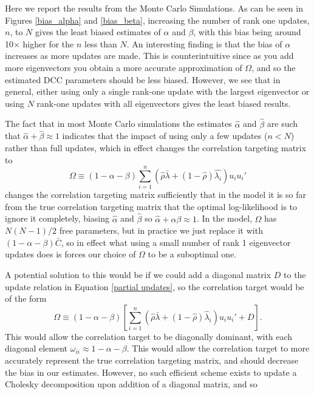 \documentclass{article} %
\numberwithin{equation}{section} %
\numberwithin{figure}{section} %
\numberwithin{table}{section} %
\begin{document}
Here we report the results from the Monte Carlo Simulations. As can be seen in Figures \ref{bias_alpha} and \ref{bias_beta}, increasing the number of rank one updates, $n$, to $N$ gives the least biased estimates of $\alpha$ and $\beta$, with this bias being around 10$\times$ higher for the $n$ less than $N$. An interesting finding is that the bias of $\alpha$ increases as more updates are made. This is counterintuitive since as you add more eigenvectors you obtain a more accurate approximation of $\Omega$, and so the estimated DCC parameters should be less biased. However, we see that in general, either using only a single rank-one update with the largest eigenvector or using $N$ rank-one updates with all eigenvectors gives the least biased results.

The fact that in most Monte Carlo simulations the estimates $\hat{\alpha}$ and $\hat{\beta}$ are such that $\hat{\alpha} + \hat{\beta} \approx 1$ indicates that the impact of using only a few updates ($n < N$) rather than full updates, which in effect changes the correlation targeting matrix to
\begin{equation} \label{partial updates}
\Omega \equiv (1 - \alpha - \beta)\sum\limits_{i=1}^{n} \left( \hat{\rho}\bar{\lambda} + (1- \hat{\rho})\hat{\lambda_i} \right) u_i u_i'
\end{equation}
changes the correlation targeting matrix sufficiently that in the model it is so far from the true correlation targeting matrix that the optimal log-likelihood is to ignore it completely, biasing $\hat{\alpha}$ and $\hat{\beta}$ so $\hat{\alpha} + \alpha{\beta} \approx 1$. In the model, $\Omega$ has $N(N-1)/2$ free parameters, but in practice we just replace it with $(1 - \alpha - \beta)\bar{C}$, so in effect what using a small number of rank 1 eigenvector updates does is forces our choice of $\Omega$ to be a suboptimal one.

A potential solution to this would be if we could add a diagonal matrix $D$ to the update relation in Equation \ref{partial updates}, so the correlation target would be of the form
\begin{equation}
\Omega \equiv (1 - \alpha - \beta)\left[\sum\limits_{i=1}^{n} \left( \hat{\rho}\bar{\lambda} + (1- \hat{\rho})\hat{\lambda}_i \right) u_i u_i' + D\right].
\end{equation}
This would allow the correlation target to be diagonally dominant, with each diagonal element $\omega_{ii} \approx 1 - \alpha - \beta$. This would allow the correlation target to more accurately represent the true correlation targeting matrix, and should decrease the bias in our estimates. However, no such efficient scheme exists to update a Cholesky decomposition upon addition of a diagonal matrix, and so
\end{document}
